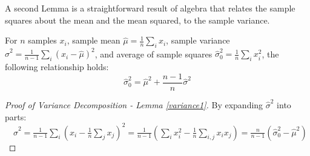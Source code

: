 A second Lemma is a straightforward result of algebra that relates the sample squares about the mean and the mean squared, to the sample variance.
\begin{lemma}\label{variance1}
For $n$ samples $x_i$, sample mean $\hat{\mu} = \frac{1}{n}\sum_ix_i$, sample variance $\hat{\sigma}^2=\frac{1}{n-1}\sum_i(x_i-\hat{\mu})^2$, and average of sample squares $\hat{\sigma}_0^2 = \frac{1}{n}\sum_ix_i^2$, the following relationship holds:
\[
\hat{\sigma}_0^2=\hat{\mu}^2+\frac{n-1}{n}\hat{\sigma}^2
\]
\end{lemma}
\begin{proof}[Proof of Variance Decomposition - Lemma \ref{variance1}]
By expanding $\hat{\sigma}^2$ into parts:\\
\(\quad\hat{\sigma}^2=\frac{1}{n-1}\sum_i\left(x_i-\frac{1}{n}\sum_jx_j \right)^2 
=\frac{1}{n-1}\left(\sum_ix_i^2-\frac{1}{n}\sum_{i,j}x_ix_j \right) = \frac{n}{n-1}\left(\hat{\sigma}_0^2-\hat{\mu}^2\right)\)
\end{proof}







